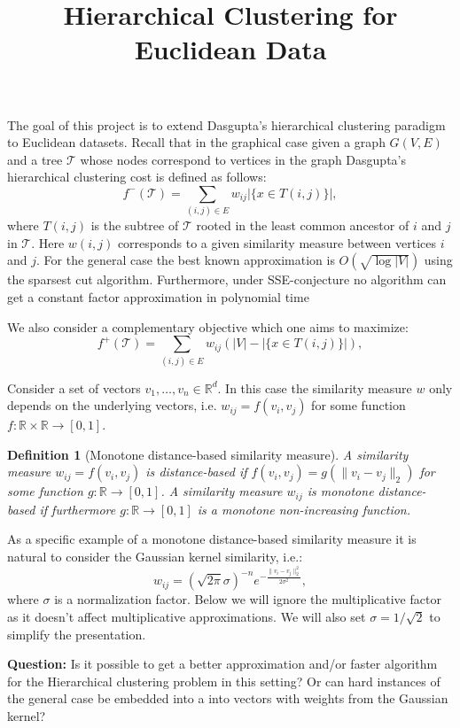 \documentclass{article}
\title{Hierarchical Clustering for Euclidean Data}
\newtheorem{definition}{Definition}[section]
\begin{document}
\maketitle
The goal of this project is to extend Dasgupta's hierarchical clustering paradigm to Euclidean datasets.
Recall that in the graphical case given a graph $G(V,E)$ and a tree $\mathcal T$ whose nodes correspond to vertices in the graph Dasgupta's hierarchical clustering cost is defined as follows:
$$f^-(\mathcal T) = \sum_{(i,j) \in E} w_{ij} |\{x \in T(i,j)\}|,$$
where $T(i,j)$ is the subtree of $\mathcal T$ rooted in the least common ancestor of $i$ and $j$ in $\mathcal T$.
Here $w(i,j)$ corresponds to a given similarity measure between vertices $i$ and $j$.
For the general case the best known approximation is $O(\sqrt{\log |V|})$ using the sparsest cut algorithm. Furthermore, under SSE-conjecture no algorithm can get a constant factor approximation in polynomial time~\cite{CC17}

We also consider a complementary objective which one aims to maximize:
$$f^+(\mathcal T) = \sum_{(i,j) \in E} w_{ij} (|V| - |\{x \in T(i,j)\}|),$$


Consider a set of vectors $v_1, \dots, v_n \in \mathbb R^d$. In this case the similarity measure $w$ only depends on the underlying vectors, i.e. $w_{ij} = f(v_i, v_j)$ for some function $f \colon \mathbb R \times \mathbb R \to [0,1]$.
\begin{definition}[Monotone distance-based similarity measure]
A similarity measure $w_{ij} = f(v_i, v_j)$ is \emph{distance-based} if $f(v_i, v_j) = g(\|v_i - v_j\|_2)$ for some function $g \colon \mathbb R \to [0,1]$.
A similarity measure $w_{ij}$ is \emph{monotone distance-based} if furthermore $g \colon \mathbb R \to [0,1]$ is a monotone non-increasing function.
\end{definition}

As a specific example of a monotone distance-based similarity measure it is natural to consider the Gaussian kernel similarity, i.e.: 
$$w_{ij} = (\sqrt{2 \pi} \sigma)^{-n} e^{- \frac{\|v_i - v_j\|_2^2}{2\sigma^2}},$$ 
where $\sigma$ is a normalization factor. Below we will ignore the multiplicative factor as it doesn't affect multiplicative approximations. We will also set $\sigma = 1/\sqrt{2}$ to simplify the presentation.

\textbf{Question:} Is it possible to get a better approximation and/or faster algorithm for the Hierarchical clustering problem in this setting? Or can hard instances of the general case be embedded into a into vectors with weights from the Gaussian kernel?
\end{document}

